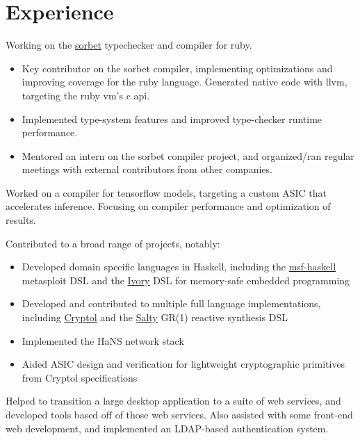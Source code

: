 \documentclass[letter,10pt]{moderncv}
\begin{document}
\makecvtitle

\section{Experience}

  {}{Working on the \href{https://sorbet.org}{sorbet} typechecker and compiler for ruby.
  \begin{itemize}%
  \item Key contributor on the sorbet compiler, implementing optimizations and
    improving coverage for the ruby language. Generated native code with llvm,
    targeting the ruby vm's c api.
  \item Implemented type-system features and improved type-checker runtime performance.
  \item Mentored an intern on the sorbet compiler project, and organized/ran
    regular meetings with external contributors from other companies.
  \end{itemize}}

  {}{Worked on a compiler for tensorflow models, targeting a custom ASIC
  that accelerates inference. Focusing on compiler performance and optimization
  of results.}

  {}{Contributed to a broad range of projects, notably:
  \begin{itemize}%
  \item Developed domain specific languages in Haskell, including the
    \href{https://github.com/galoisinc/msf-haskell}{msf-haskell} metasploit DSL
    and the \href{https://github.com/galoisinc/ivory}{Ivory} DSL for memory-safe
    embedded programming
  \item Developed and contributed to multiple full language implementations,
    including \href{https://github.com/galoisinc/cryptol}{Cryptol} and the
    \href{https://github.com/galoisinc/salty}{Salty} GR(1) reactive synthesis DSL
  \item Implemented the HaNS network stack
  \item Aided ASIC design and verification for lightweight cryptographic
    primitives from Cryptol specifications
  \end{itemize}}

  {}{Helped to transition a large desktop application to a suite of web
  services, and developed tools based off of those web services. Also assisted
  with some front-end web development, and implemented an LDAP-based
  authentication system.}
\end{document}
